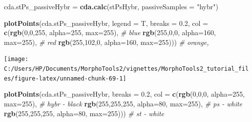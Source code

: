 \documentclass[
]{article}
\newenvironment{Shaded}{\begin{snugshade}}{\end{snugshade}}
\newcommand{\CommentTok}[1]{\textcolor[rgb]{0.56,0.35,0.01}{\textit{#1}}}
\newcommand{\DataTypeTok}[1]{\textcolor[rgb]{0.13,0.29,0.53}{#1}}
\newcommand{\DecValTok}[1]{\textcolor[rgb]{0.00,0.00,0.81}{#1}}
\newcommand{\FloatTok}[1]{\textcolor[rgb]{0.00,0.00,0.81}{#1}}
\newcommand{\KeywordTok}[1]{\textcolor[rgb]{0.13,0.29,0.53}{\textbf{#1}}}
\newcommand{\NormalTok}[1]{#1}
\newcommand{\StringTok}[1]{\textcolor[rgb]{0.31,0.60,0.02}{#1}}
\begin{document}
\begin{Shaded}
\begin{Highlighting}[]

\NormalTok{cda.stPs_passiveHybr =}\StringTok{ }\KeywordTok{cda.calc}\NormalTok{(stPsHybr, }\DataTypeTok{passiveSamples =} \StringTok{"hybr"}\NormalTok{)}

\KeywordTok{plotPoints}\NormalTok{(cda.stPs_passiveHybr, }\DataTypeTok{legend =}\NormalTok{ T, }\DataTypeTok{breaks =} \FloatTok{0.2}\NormalTok{,}
                \DataTypeTok{col =} \KeywordTok{c}\NormalTok{(}\KeywordTok{rgb}\NormalTok{(}\DecValTok{0}\NormalTok{,}\DecValTok{0}\NormalTok{,}\DecValTok{255}\NormalTok{, }\DataTypeTok{alpha=}\DecValTok{255}\NormalTok{, }\DataTypeTok{max=}\DecValTok{255}\NormalTok{), }\CommentTok{# blue}
                        \KeywordTok{rgb}\NormalTok{(}\DecValTok{255}\NormalTok{,}\DecValTok{0}\NormalTok{,}\DecValTok{0}\NormalTok{, }\DataTypeTok{alpha=}\DecValTok{160}\NormalTok{, }\DataTypeTok{max=}\DecValTok{255}\NormalTok{), }\CommentTok{# red}
                        \KeywordTok{rgb}\NormalTok{(}\DecValTok{255}\NormalTok{,}\DecValTok{102}\NormalTok{,}\DecValTok{0}\NormalTok{, }\DataTypeTok{alpha=}\DecValTok{160}\NormalTok{, }\DataTypeTok{max=}\DecValTok{255}\NormalTok{))) }\CommentTok{# orange, }
\end{Highlighting}
\end{Shaded}

\begin{center}\texttt{[image: C:/Users/HP/Documents/MorphoTools2/vignettes/MorphoTools2\_tutorial\_files/figure-latex/unnamed-chunk-69-1]} \end{center}

\begin{Shaded}
\begin{Highlighting}[]
\KeywordTok{plotPoints}\NormalTok{(cda.stPs_passiveHybr, }\DataTypeTok{breaks =} \FloatTok{0.2}\NormalTok{,}
                \DataTypeTok{col =} \KeywordTok{c}\NormalTok{(}\KeywordTok{rgb}\NormalTok{(}\DecValTok{0}\NormalTok{,}\DecValTok{0}\NormalTok{,}\DecValTok{0}\NormalTok{, }\DataTypeTok{alpha=}\DecValTok{255}\NormalTok{, }\DataTypeTok{max=}\DecValTok{255}\NormalTok{), }\CommentTok{# hybr - black}
                        \KeywordTok{rgb}\NormalTok{(}\DecValTok{255}\NormalTok{,}\DecValTok{255}\NormalTok{,}\DecValTok{255}\NormalTok{, }\DataTypeTok{alpha=}\DecValTok{80}\NormalTok{, }\DataTypeTok{max=}\DecValTok{255}\NormalTok{), }\CommentTok{# ps - white}
                        \KeywordTok{rgb}\NormalTok{(}\DecValTok{255}\NormalTok{,}\DecValTok{255}\NormalTok{,}\DecValTok{255}\NormalTok{, }\DataTypeTok{alpha=}\DecValTok{80}\NormalTok{, }\DataTypeTok{max=}\DecValTok{255}\NormalTok{))) }\CommentTok{# st - white }
\end{Highlighting}
\end{Shaded}
\end{document}
